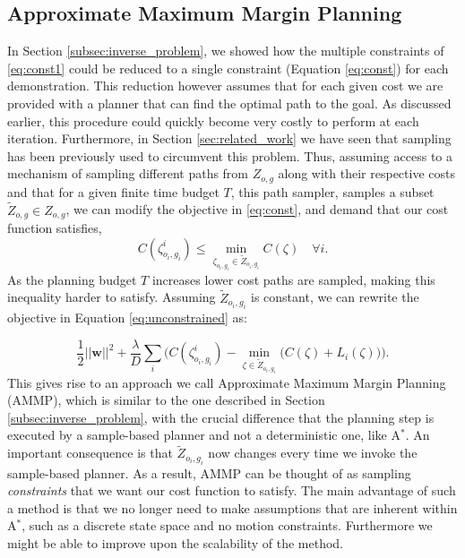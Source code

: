 \documentclass{article}  %
\begin{document}

	\subsection{Approximate Maximum Margin Planning \label{subsec:ammp}}

		In Section \ref{subsec:inverse_problem}, we showed how the multiple constraints of \eqref{eq:const1} could be reduced to a single constraint (Equation \eqref{eq:const}) for each demonstration. This reduction however assumes that for each given cost we are provided with a planner that can find the optimal path to the goal. As discussed earlier, this procedure could quickly become very costly to perform at each iteration. Furthermore, in Section \ref{sec:related_work} we have seen that sampling has been previously used to circumvent this problem.
		 Thus, assuming access to a mechanism of sampling different paths from $Z_{o,g}$ along with their respective costs and that for a given finite time budget $T$, this path sampler, samples a subset $\tilde{Z}_{o,g} \in Z_{o,g}$, we can modify the objective in \eqref{eq:const}, and demand that our cost function satisfies,
\begin{equation}
	C(\zeta^i_{o_i,g_i}) \leq \min_{\zeta_{o_i,g_i} \in \tilde{Z}_{o_i,g_i}} C(\zeta) \quad \forall i. \label{eq:const_rrt}
\end{equation}
	As the planning budget $T$ increases lower cost paths are sampled, making this inequality harder to satisfy. Assuming $\tilde{Z}_{o_i,g_i}$ is constant, we can rewrite the objective in Equation \eqref{eq:unconstrained} as:

	\begin{equation} \frac{1}{2}||\mathbf{w}||^2 + \frac{\lambda}{D} \sum_i \big( C(\zeta^i_{o_i,g_i}) - \min_{\zeta \in \tilde{Z}_{o_i,g_i}}\big(C(\zeta) + L_i(\zeta)\big) \big). \label{eq:unconstrained_rrt}
	\end{equation}
	This gives rise to an approach we call Approximate Maximum Margin Planning (AMMP), which is similar  to the one described in Section \ref{subsec:inverse_problem}, with the crucial difference that the planning step is executed by a sample-based planner and not a deterministic one, like A$^*$. An important consequence is that $\tilde{Z}_{o_i,g_i}$ now changes every time we invoke the sample-based planner. As a result, AMMP can be thought of as sampling \emph{constraints} that we want our cost function to satisfy. The main advantage of such a method is that we no longer need to make assumptions that are inherent within A$^*$, such as a discrete state space and no motion constraints. Furthermore we might be able to improve upon the scalability of the method. 
\end{document}
